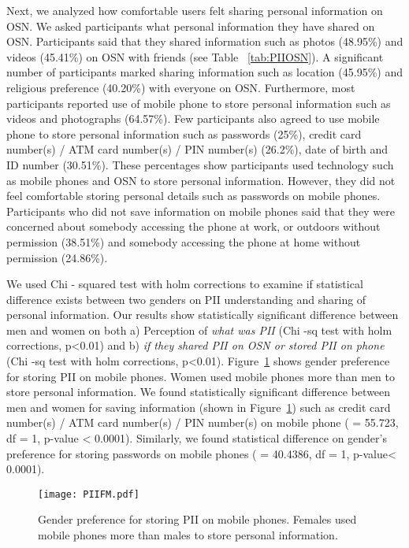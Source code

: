 Next, we analyzed how comfortable users felt sharing personal information on OSN. We asked participants what personal information they have shared on OSN. Participants said that they shared information such as photos (48.95\%) and videos (45.41\%) on OSN with friends (see Table ~\ref{tab:PIIOSN}). A significant number of participants marked sharing information such as location (45.95\%) and religious preference (40.20\%) with everyone on OSN. Furthermore, most participants reported use of mobile phone to store personal information such as videos and photographs (64.57\%). Few participants also agreed to use mobile phone to store personal information such as passwords (25\%), credit card number(s) / ATM card number(s) / PIN number(s) (26.2\%), date of birth and ID number (30.51\%). These percentages show participants used technology such as mobile phones and OSN to store personal information. However, they did not feel comfortable storing personal details such as passwords on mobile phones. Participants who did not save information on mobile phones said that they were concerned about somebody accessing the phone at work, or outdoors without permission (38.51\%) and somebody accessing the phone at home without permission (24.86\%). 


We used Chi - squared test with holm corrections to examine if statistical difference exists between two genders on PII understanding and sharing of personal information. Our results show statistically significant difference between men and women on both a) Perception of \emph{what was PII} (Chi -sq test with holm corrections, p<0.01) and b) \emph{if they shared PII on OSN or stored PII on phone} (Chi -sq test with holm corrections, p<0.01). Figure~\ref{fig:FM2} shows gender preference for storing PII on mobile phones. Women used mobile phones more than men to store personal information. We found statistically significant difference between men  and women for saving information (shown in Figure~\ref{fig:FM2}) such as credit card number(s) / ATM card number(s) / PIN number(s) on mobile phone ( = 55.723, df = 1, p-value < 0.0001). Similarly, we found statistical difference on gender's preference for storing passwords on mobile phones ( = 40.4386, df = 1, p-value< 0.0001). 

\begin{figure}[!htbp]
\begin{center}
\vspace{-5mm}
\texttt{[image: PIIFM.pdf]}
\vspace{-3mm}
\caption{\small{Gender preference for storing PII on mobile phones. Females used mobile phones more than males to store personal information.}}
\label{fig:FM2}
\end{center}
\vspace{-5mm}
\end{figure}
	

